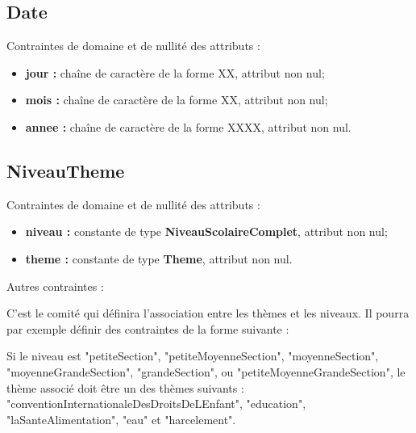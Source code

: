 \documentclass[asi, sansVersion]{picInsa}
\begin{document}
\subsection*{Date}
Contraintes de domaine et de nullité des attributs :
\begin{itemize}
	\item \textbf{jour :} chaîne de caractère de la forme XX, attribut non nul;
	\item \textbf{mois :} chaîne de caractère de la forme XX, attribut non nul;  
	\item \textbf{annee :} chaîne de caractère de la forme XXXX, attribut non nul. 
\end{itemize}

\subsection*{NiveauTheme}
Contraintes de domaine et de nullité des attributs :
\begin{itemize}
	\item \textbf{niveau :} constante de type \textbf{NiveauScolaireComplet}, attribut non nul;
	\item \textbf{theme :} constante de type \textbf{Theme}, attribut non nul.\\
\end{itemize}

Autres contraintes :

C'est le comité qui définira l'association entre les thèmes et les niveaux. Il pourra par exemple définir des contraintes de la forme suivante :

Si le niveau est "petiteSection", "petiteMoyenneSection", "moyenneSection", "moyenneGrandeSection", "grandeSection", ou "petiteMoyenneGrandeSection", le thème associé doit être un des thèmes suivants : "conventionInternationaleDesDroitsDeLEnfant", "education", "laSanteAlimentation", "eau" et "harcelement". \\

%
%
\end{document}
